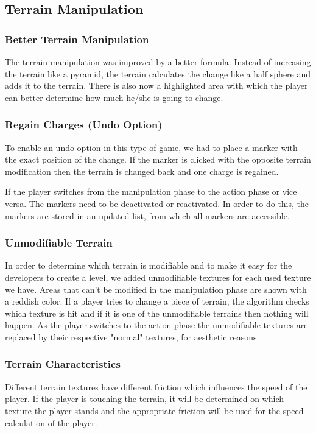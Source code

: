\documentclass[12pt, letterpaper]{scrartcl}
\begin{document}
	 \subsection{Terrain Manipulation}
	 \subsubsection{Better Terrain Manipulation}
	 The terrain manipulation was improved by a better formula. Instead of increasing the terrain like a pyramid, the terrain calculates the change like a half sphere and adds it to the terrain. There is also now a highlighted area with which the player can better determine how much he/she is going to change.
	 
	 \subsubsection{Regain Charges (Undo Option)}
	 To enable an undo option in this type of game, we had to place a marker with the exact position of the change. If the marker is clicked with the opposite terrain modification then the terrain is changed back and one charge is regained. 
	 
	 If the player switches from the manipulation phase to the action phase or vice versa. The markers need to be deactivated or reactivated. In order to do this, the markers are stored in an updated list, from which all markers are accessible. 
	 
	 \subsubsection{Unmodifiable Terrain}
	 In order to determine which terrain is modifiable and to make it easy for the developers to create a level, we added unmodifiable textures for each used texture we have. Areas that can't be modified in the manipulation phase are shown with a reddish color. If a player tries to change a piece of terrain, the algorithm checks which texture is hit and if it is one of the unmodifiable terrains then nothing will happen. As the player switches to the action phase the unmodifiable textures are replaced by their respective "normal" textures, for aesthetic reasons. 
	 
	 \subsubsection{Terrain Characteristics}
	 Different terrain textures have different friction which influences the speed of the player. If the player is touching the terrain, it will be determined on which texture the player stands and the appropriate friction will be used for the speed calculation of the player.
	 
\end{document}
